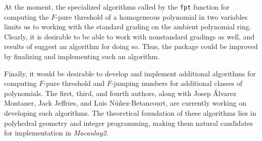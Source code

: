 \documentclass{amsart}
\begin{document}
At the moment, the specialized algorithms called by the \texttt{fpt} function for computing the $F$-pure threshold of a homogeneous polynomial in two variables limits us to working with the standard grading on the ambient polynomial ring.  Clearly, it is desirable to be able to work with nonstandard gradings as well, and results of \cite{HernandezTeixeiraFThresholdFunctions} suggest an algorithm for doing so.  Thus, the package could be improved by finalizing and implementing such an algorithm.

Finally, it would be desirable to develop and implement additional algorithms for computing $F$-pure threshold and $F$-jumping numbers for additional classes of polynomials.  The first, third, and fourth authors, along with Josep \'Alvarez Montaner, Jack Jeffries, and Luis N\'u\~nez-Betancourt,  are currently working on developing such algorithms.  The theoretical foundation of these algorithms lies in polyhedral geometry and integer programming, making them natural candidates for  implementation in \emph{Macaulay2}.  




\end{document}
